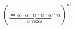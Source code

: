 \documentclass[preview]{standalone}
\begin{document}
\begin{align*}
(\underbrace{=a \cdot a \cdot a \cdot a \cdot a \cdots a}_{n \text{ vezes}})^m
\end{align*}
\end{document}
